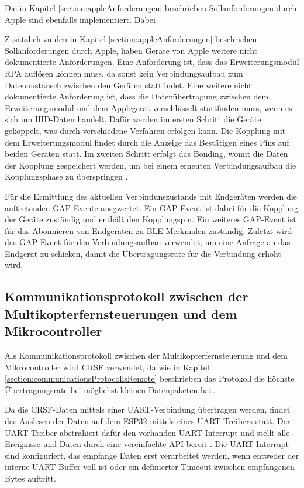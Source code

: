 Die in Kapitel \ref{section:appleAnforderungen} beschrieben Sollanforderungen durch Apple sind ebenfalls implementiert. Dabei 

Zusätzlich zu den in Kapitel \ref{section:appleAnforderungen} beschrieben Sollanforderungen durch Apple, haben Geräte von Apple weitere nicht dokumentierte Anforderungen. Eine Anforderung ist, dass das Erweiterungsmodul \ac{RPA} auflösen können muss, da sonst kein Verbindungsaufbau zum Datenaustausch zwischen den Geräten stattfindet. Eine weitere nicht dokumentierte Anforderung ist, dass die Datenübertragung zwischen dem Erweiterungsmodul und dem Applegerät verschlüsselt stattfinden muss, wenn es sich um \ac{HID}-Daten handelt. Dafür werden im ersten Schritt die Geräte gekoppelt, was durch verschiedene Verfahren erfolgen kann. Die Kopplung mit dem Erweiterungsmodul findet durch die Anzeige das Bestätigen eines Pins auf beiden Geräten statt. Im zweiten Schritt erfolgt das Bonding, womit die Daten der Kopplung gespeichert werden, um bei einem erneuten Verbindungsaufbau die Kopplungsphase zu überspringen \cite{kyneticsBondingPairng}.

Für die Ermittlung des aktuellen Verbindunszustands mit Endgeräten werden die auftretenden \ac{GAP}-Evente ausgwertet. Ein \ac{GAP}-Event ist dabei für die Kopplung der Geräte zuständig und enthält den Kopplungspin. Ein weiteres \ac{GAP}-Event ist für das Abonnieren von Endgeräten zu \ac{BLE}-Merkmalen zuständig. Zuletzt wird das \ac{GAP}-Event für den Verbindungsaufbau verwendet, um eine Anfrage an das Endgerät zu schicken, damit die Übertragungsrate für die Verbindung erhöht wird.

\subsection{Kommunikationsprotokoll zwischen der Multikopterfernsteuerungen und dem Mikrocontroller}
Als Kommunikationsprotokoll zwischen der Multikopterfernsteuerung und dem Mikrocontroller wird CRSF verwendet, da wie in Kapitel \ref{section:communicationsProtocollsRemote} beschrieben das Protokoll die höchste Übertragungsrate bei möglichst kleinen Datenpaketen hat.

Da die CRSF-Daten mittels einer \ac{UART}-Verbindung übertragen werden, findet das Auslesen der Daten auf dem ESP32 mittels eines \ac{UART}-Treibers statt. Der \ac{UART}-Treiber abstrahiert dafür den vorhanden \ac{UART}-Interrupt und stellt alle Ereignisse und Daten durch eine vereinfachte API bereit \cite{espUARTDriver}. Die \ac{UART}-Interrupt sind konfiguriert, das empfange Daten erst verarbeitet werden, wenn entweder der interne \ac{UART}-Buffer voll ist oder ein definierter Timeout zwischen empfangenen Bytes auftritt.

